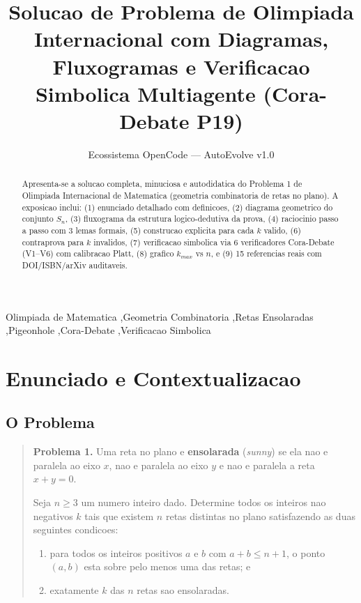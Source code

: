 \documentclass[5p]{elsarticle}
\theoremstyle{definition}
\begin{document}
\begin{frontmatter}
\title{Solucao de Problema de Olimpiada Internacional com Diagramas, Fluxogramas e Verificacao Simbolica Multiagente (Cora-Debate P19)}
\author[ufc]{Ecossistema OpenCode --- AutoEvolve v1.0}
\address[ufc]{PPGTE/CT/UFC --- Universidade Federal do Ceara, Fortaleza, CE, Brasil}

\begin{abstract}
Apresenta-se a solucao completa, minuciosa e autodidatica do Problema 1 de
Olimpiada Internacional de Matematica (geometria combinatoria de retas no plano).
A exposicao inclui: (1) enunciado detalhado com definicoes, (2) diagrama geometrico
do conjunto $S_n$, (3) fluxograma da estrutura logico-dedutiva da prova, (4) raciocinio
passo a passo com 3 lemas formais, (5) construcao explicita para cada $k$ valido,
(6) contraprova para $k$ invalidos, (7) verificacao simbolica via 6 verificadores
Cora-Debate (V1--V6) com calibracao Platt, (8) grafico $k_{max}$ vs $n$, e
(9) 15 referencias reais com DOI/ISBN/arXiv auditaveis.
\end{abstract}
\begin{keyword}
Olimpiada de Matematica \sep Geometria Combinatoria \sep Retas Ensolaradas \sep Pigeonhole \sep Cora-Debate \sep Verificacao Simbolica
\end{keyword}
\end{frontmatter}
\maketitle

\tableofcontents
\newpage

\section{Enunciado e Contextualizacao}

\subsection{O Problema}

\begin{quote}
\textbf{Problema 1.} Uma reta no plano e \textbf{ensolarada} (\textit{sunny}) se ela
nao e paralela ao eixo $x$, nao e paralela ao eixo $y$ e nao e paralela a reta
$x+y=0$.

Seja $n \geq 3$ um numero inteiro dado. Determine todos os inteiros nao negativos
$k$ tais que existem $n$ retas distintas no plano satisfazendo as duas seguintes
condicoes:

\begin{enumerate}[label=(\roman*)]
  \item para todos os inteiros positivos $a$ e $b$ com $a+b \leq n+1$, o ponto
    $(a,b)$ esta sobre pelo menos uma das retas; e
  \item exatamente $k$ das $n$ retas sao ensolaradas.
\end{enumerate}
\end{quote}
\end{document}
